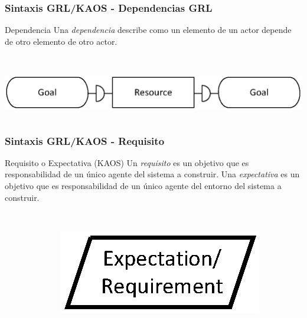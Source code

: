 \documentclass[slidestop,xcolor=pst,dvips,blue]{beamer}
\begin{document}
\begin{frame}[t]
	\frametitle{Sintaxis GRL/KAOS - Dependencias GRL}
	\begin{block}{Dependencia}
		Una \alert{\emph{dependencia}} describe como un elemento de un actor depende de otro  elemento de otro actor.
		\ \\
		\ \\
		\begin{columns}
			\begin{column}{\linewidth}
				\centering \includegraphics[width=0.75\columnwidth,keepaspectratio=true]{images/objetivos/dependency(GRL).eps}
			\end{column}
		\end{columns}
	\end{block}
\end{frame}

\begin{frame}[c]
    \frametitle{Sintaxis GRL/KAOS - Requisito}
    \begin{block}{Requisito o Expectativa (KAOS)}
        Un \alert{\emph{requisito}} es un objetivo que es responsabilidad de un único agente del sistema a construir. Una \alert{\emph{expectativa}} es un objetivo que es responsabilidad de un único agente del entorno del sistema a construir.
        \ \\
        \ \\
        \begin{columns}[c]
            \begin{column}{0.50\linewidth}
            \end{column}
            \begin{column}{0.50\linewidth}
                \centering \includegraphics[width=0.50\columnwidth,keepaspectratio=true]{images/objetivos/expectation(KAOS).eps}
            \end{column}
        \end{columns}
     \end{block}
\end{frame}
\end{document}
